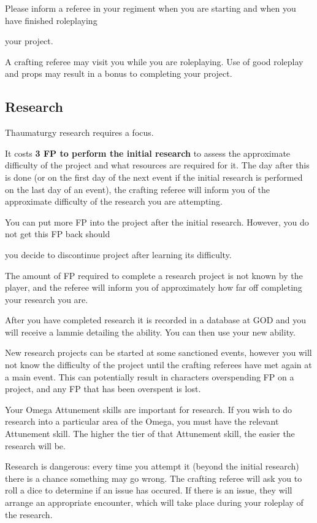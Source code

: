 \documentclass{scrbook}
\begin{document}
Please inform a referee in your regiment when you are starting and when you have finished roleplaying

your project.

A crafting referee may visit you while you are roleplaying. Use of good roleplay and props may result in a bonus to completing your project.

\subsection{Research}

Thaumaturgy research requires a focus.

It costs \textbf{3 FP to perform the initial research} to assess the approximate difficulty of the project and what resources are required for it. The day after this is done (or on the first day of the next event if the initial research is performed on the last day of an event), the crafting referee will inform you of the approximate difficulty of the research you are attempting.

You can put more FP into the project after the initial research. However, you do not get this FP back should

you decide to discontinue project after learning its difficulty.

The amount of FP required to complete a research project is not known by the player, and the referee will inform you of approximately how far off completing your research you are.

After you have completed research it is recorded in a database at GOD and you will receive a lammie detailing the ability. You can then use your new ability.

New research projects can be started at some sanctioned events, however you will not know the difficulty of the project until the crafting referees have met again at a main event. This can potentially result in characters overspending FP on a project, and any FP that has been overspent is lost.

Your Omega Attunement skills are important for research. If you wish to do research into a particular area of the Omega, you must have the relevant Attunement skill. The higher the tier of that Attunement skill, the easier the research will be.

Research is dangerous: every time you attempt it (beyond the initial research) there is a chance something may go wrong. The crafting referee will ask you to roll a dice to determine if an issue has occured. If there is an issue, they will arrange an appropriate encounter, which will take place during your roleplay of the research.
\end{document}
